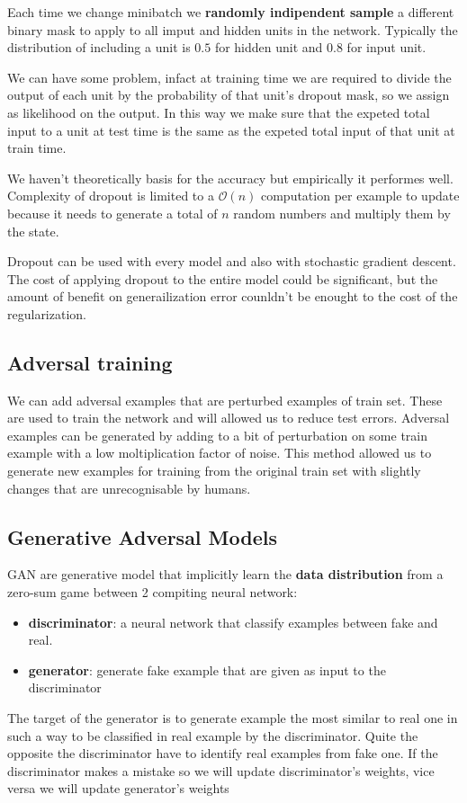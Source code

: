 Each time we change minibatch we \textbf{randomly indipendent sample} a different binary mask to apply
to all imput and hidden units in the network. Typically the distribution of including 
a unit is $0.5$ for hidden unit and $0.8$ for input unit.

We can have some problem, infact at training time we are required to divide the 
output of each unit by the probability of that unit's dropout mask, so we assign 
as likelihood on the output. In this way we make sure that the expeted total 
input to a unit at test time is the same as the expeted total input of that unit 
at train time.

We haven't theoretically basis for the accuracy but empirically it performes well.
Complexity of dropout is limited to a $\mathcal{O}(n)$ computation per example 
to update because it needs to generate a total of $n$ random numbers and multiply them
by the state. 

Dropout can be used with every model and also with stochastic gradient descent.
The cost of applying dropout to the entire model could be significant, but the amount of 
benefit on generailization error counldn't be enought to the cost of the regularization.

\subsection{Adversal training}
We can add adversal examples that are perturbed examples of train set. These
are used to train the network and will allowed us to reduce test errors. Adversal 
examples can be generated by adding to a bit of perturbation on some train example 
with a low moltiplication factor of noise. This method allowed us to 
generate new examples for training from the original train set with slightly changes
that are unrecognisable by humans.

\subsection{Generative Adversal Models}
GAN are generative model that implicitly learn the \textbf{data distribution}
from a zero-sum game between 2 compiting neural network:
\begin{itemize}
    \item \textbf{discriminator}: a neural network that classify examples between 
    fake and real. 
    \item \textbf{generator}: generate fake example that are given as input to the 
    discriminator
\end{itemize}

The target of the generator is to generate example the most similar to real one 
in such a way to be classified in real example by the discriminator. Quite the
opposite the discriminator have to identify real examples from fake one. If the 
discriminator makes a mistake so we will update discriminator's weights, vice versa we will
update generator's weights
 